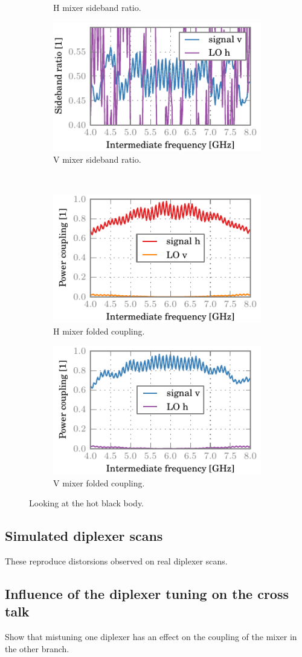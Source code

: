 \begin{figure}[hbtp]
\begin{subfigure}[b]{.5\textwidth}
        \caption{H mixer sideband ratio.}
    \end{subfigure}%
    \begin{subfigure}[b]{.5\textwidth}
        \includegraphics{chapter_3/15_everything_v_sbr}%
        \caption{V mixer sideband ratio.}
    \end{subfigure}%
    \\
    \begin{subfigure}[b]{.5\textwidth}
        \includegraphics{chapter_3/15_everything_h_ssb}%
        \caption{H mixer folded coupling.}
    \end{subfigure}%
    \begin{subfigure}[b]{.5\textwidth}
        \includegraphics{chapter_3/15_everything_v_ssb}%
        \caption{V mixer folded coupling.}
    \end{subfigure}%
    \caption{Looking at the hot black body.}
    \label{fig:15_everything}
\end{figure}

\subsection{Simulated diplexer scans}
These reproduce distorsions observed on real diplexer scans.

\subsection{Influence of the diplexer tuning on the cross talk}
Show that mistuning one diplexer has an effect on the coupling of the mixer in the other branch.
